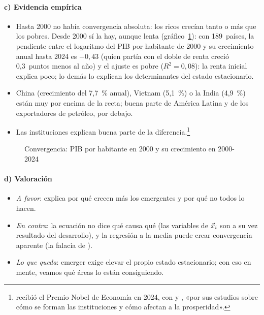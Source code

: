 \documentclass[11pt]{article}
\begin{document}
\paragraph{c) Evidencia empírica}

\begin{itemize}
\item Hasta 2000 no había convergencia absoluta: los ricos crecían tanto o más que los pobres. Desde 2000 sí la hay, aunque lenta (gráfico~\ref{fig:convergencia}): con 189~países, la pendiente entre el logaritmo del PIB por habitante de 2000 y su crecimiento anual hasta 2024 es $-0{,}43$ (quien partía con el doble de renta creció 0,3~puntos menos al año) y el ajuste es pobre ($R^2=0{,}08$): la renta inicial explica poco; lo demás lo explican los determinantes del estado estacionario\nocite{BM2026WDIPIBpc,KremerWillisYou2022}.
\item China (crecimiento del 7,7~\% anual), Vietnam (5,1~\%) o la India (4,9~\%) están muy por encima de la recta; buena parte de América Latina y de los exportadores de petróleo, por debajo.
\item Las instituciones explican buena parte de la diferencia\nocite{AcemogluJohnsonRobinson2001Colonial}.\footnote{ recibió el Premio Nobel de Economía en 2024, con  y , «por sus estudios sobre cómo se forman las instituciones y cómo afectan a la prosperidad»\nocite{NobelPrize2024}.}
\end{itemize}

\begin{figure}[H]
\centering
\caption{Convergencia: PIB por habitante en 2000 y su crecimiento en 2000-2024}\label{fig:convergencia}
\end{figure}

\paragraph{d) Valoración}

\begin{itemize}
\item \emph{A favor}: explica por qué crecen más los emergentes y por qué no todos lo hacen.
\item \emph{En contra}: la ecuación no dice qué causa qué (las variables de $\vec{x}_i$ son a su vez resultado del desarrollo), y la regresión a la media puede crear convergencia aparente (la falacia de )\nocite{Quah1996}.
\item \emph{Lo que queda}: emerger exige elevar el propio estado estacionario; con eso en mente, veamos qué áreas lo están consiguiendo.
\end{itemize}
\end{document}
